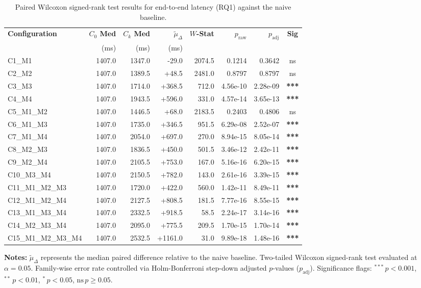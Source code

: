 \begin{table}[!htbp]
\centering
\small
\caption{Paired Wilcoxon signed-rank test results for end-to-end latency (RQ1) against the naive baseline.}
\label{tab:wilcoxon_rq1}
\begin{tabular*}{\textwidth}{@{\extracolsep{\fill}} l r r r r r r c @{}}
\toprule
\textbf{Configuration} & \textbf{$C_0$ Med} & \textbf{$C_k$ Med} & \textbf{$\tilde{\mu}_\Delta$} & \textbf{$W$-Stat} & \textbf{$p_{\text{raw}}$} & \textbf{$p_{\text{adj}}$} & \textbf{Sig} \\
 & \scriptsize{(ms)} & \scriptsize{(ms)} & \scriptsize{(ms)} & & & & \\
\midrule
C1\_M1 & 1407.0 & 1347.0 & -29.0 & 2074.5 & 0.1214 & 0.3642 & ns \\
C2\_M2 & 1407.0 & 1389.5 & +48.5 & 2481.0 & 0.8797 & 0.8797 & ns \\
C3\_M3 & 1407.0 & 1714.0 & +368.5 & 712.0 & 4.56e-10 & 2.28e-09 & \textbf{***} \\
C4\_M4 & 1407.0 & 1943.5 & +596.0 & 331.0 & 4.57e-14 & 3.65e-13 & \textbf{***} \\
C5\_M1\_M2 & 1407.0 & 1446.5 & +68.0 & 2183.5 & 0.2403 & 0.4806 & ns \\
C6\_M1\_M3 & 1407.0 & 1735.0 & +346.5 & 951.5 & 6.29e-08 & 2.52e-07 & \textbf{***} \\
C7\_M1\_M4 & 1407.0 & 2054.0 & +697.0 & 270.0 & 8.94e-15 & 8.05e-14 & \textbf{***} \\
C8\_M2\_M3 & 1407.0 & 1836.5 & +450.0 & 501.5 & 3.46e-12 & 2.42e-11 & \textbf{***} \\
C9\_M2\_M4 & 1407.0 & 2105.5 & +753.0 & 167.0 & 5.16e-16 & 6.20e-15 & \textbf{***} \\
C10\_M3\_M4 & 1407.0 & 2150.5 & +782.0 & 143.0 & 2.61e-16 & 3.39e-15 & \textbf{***} \\
C11\_M1\_M2\_M3 & 1407.0 & 1720.0 & +422.0 & 560.0 & 1.42e-11 & 8.49e-11 & \textbf{***} \\
C12\_M1\_M2\_M4 & 1407.0 & 2127.5 & +808.5 & 181.5 & 7.77e-16 & 8.55e-15 & \textbf{***} \\
C13\_M1\_M3\_M4 & 1407.0 & 2332.5 & +918.5 & 58.5 & 2.24e-17 & 3.14e-16 & \textbf{***} \\
C14\_M2\_M3\_M4 & 1407.0 & 2095.0 & +775.5 & 209.5 & 1.70e-15 & 1.70e-14 & \textbf{***} \\
C15\_M1\_M2\_M3\_M4 & 1407.0 & 2532.5 & +1161.0 & 31.0 & 9.89e-18 & 1.48e-16 & \textbf{***} \\
\bottomrule
\end{tabular*}
\vspace{0.5em}
\parbox{\textwidth}{\footnotesize
\textbf{Notes:} $\tilde{\mu}_\Delta$ represents the median paired difference relative to the naive baseline. Two-tailed Wilcoxon signed-rank test evaluated at $\alpha = 0.05$. Family-wise error rate controlled via Holm-Bonferroni step-down adjusted $p$-values ($p_{\text{adj}}$). Significance flags: $^{***}\,p < 0.001$, $^{**}\,p < 0.01$, $^{*}\,p < 0.05$, $\text{ns}\,p \ge 0.05$.}
\end{table}
